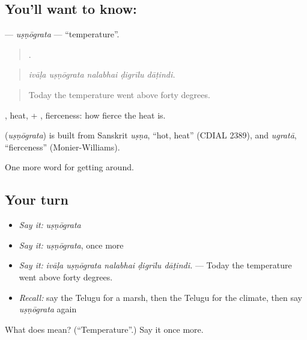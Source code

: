 \subsection*{You'll want to know: }
\textbf{} — \emph{uṣṇōgrata} — \textquotedblleft{}temperature\textquotedblright{}.

\begin{quote}
    .
\end{quote}

\begin{quote}
\emph{ivāḷa uṣṇōgrata nalabhai ḍigrīlu dāṭindi.}
\end{quote}

\begin{quote}
Today the temperature went above forty degrees.
\end{quote}

, heat, + , fierceness: how fierce the heat is.

\begin{cousinweb}
\textbf{} (\emph{uṣṇōgrata}) is built from Sanskrit \emph{uṣṇa}, \textquotedblleft{}hot, heat\textquotedblright{} (CDIAL 2389), and \emph{ugratā}, \textquotedblleft{}fierceness\textquotedblright{} (Monier-Williams).
\end{cousinweb}

\begin{grammarlens}[title={What you've built}]
One more word for getting around.
\end{grammarlens}

\subsection*{Your turn}
\begin{itemize}
\raggedright
  \item \emph{Say it:} \emph{uṣṇōgrata}
  \item \emph{Say it:} \emph{uṣṇōgrata}, once more
  \item \emph{Say it:} \emph{ivāḷa uṣṇōgrata nalabhai ḍigrīlu dāṭindi.} — Today the temperature went above forty degrees.
  \item \emph{Recall:} say the Telugu for a marsh, then the Telugu for the climate, then say \emph{uṣṇōgrata} again
\end{itemize}

\begin{tcolorbox}[breakable,colback=teal!4,colframe=teal!35!black,title={Before you move on}]
What does  mean? (\textquotedblleft{}Temperature\textquotedblright{}.) Say it once more.
\end{tcolorbox}
